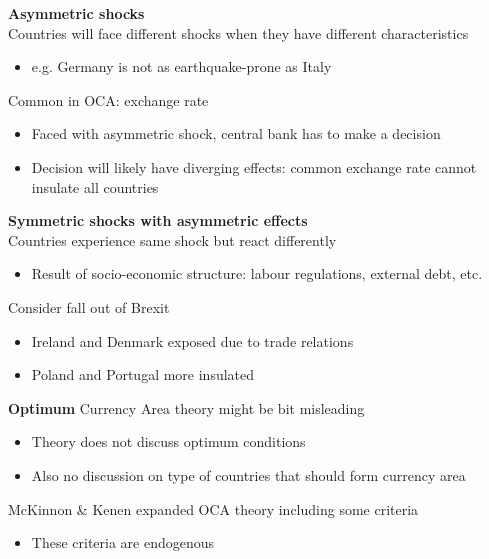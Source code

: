 \documentclass{beamer}
\begin{document}
\begin{frame}
  \textbf{Asymmetric shocks}\\
  \medskip
  Countries will face different shocks when they have different characteristics
  \begin{itemize}
    \item e.g. Germany is not as earthquake-prone as Italy
  \end{itemize}
  \medskip
   Common in OCA: exchange rate  
  \begin{itemize}
    \item Faced with asymmetric shock, central bank has to make a decision
    \item Decision will likely have diverging effects: common exchange rate cannot insulate all countries
  \end{itemize}
\end{frame}

\begin{frame}
  \textbf{Symmetric shocks with asymmetric effects}\\
  \medskip
  Countries experience same shock but react differently
  \begin{itemize}
    \item Result of socio-economic structure: labour regulations, external debt, etc.
  \end{itemize}
  \medskip
  Consider fall out of Brexit
  \begin{itemize}
    \item Ireland and Denmark exposed due to trade relations
    \item Poland and Portugal more insulated
  \end{itemize}
\end{frame}

\begin{frame}
  \textbf{Optimum} Currency Area theory might be bit misleading
  \begin{itemize}
    \item Theory does not discuss optimum conditions
    \item Also no discussion on type of countries that should form currency area
  \end{itemize}
  \medskip
  McKinnon \& Kenen expanded OCA theory including some criteria
  \begin{itemize}
    \item These criteria are endogenous
  \end{itemize}
\end{frame}
\end{document}
